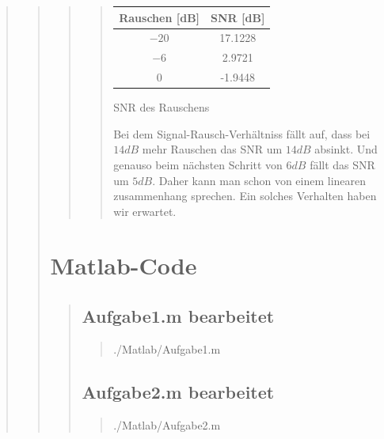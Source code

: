 \begin{quote}
\begin{quote}
\begin{quote}
\begin{quote}
            \begin{center}
                  \begin{tabular}{|c|c|}
                  \hline
                   Rauschen [dB] &  SNR [dB] \\ \hline 
                   $-20$ &  17.1228 \\ \hline
                   $-6$ &  2.9721 \\ \hline
                   $0$ &  -1.9448 \\ \hline           
                 \end{tabular}\vspace{1em}
                 
            \caption{SNR des Rauschens}            
            \end{center}
    
        Bei dem Signal-Rausch-Verhältniss fällt auf, dass bei $14dB$ mehr Rauschen das SNR um $14dB$ absinkt. Und
        genauso beim nächsten Schritt von $6dB$ fällt das SNR um $5dB$. Daher kann man schon von einem linearen
        zusammenhang sprechen. Ein solches Verhalten haben wir erwartet. 
    \end{quote}	
\end{quote}	




\section{Matlab-Code}
\begin{quote}
    \subsection{Aufgabe1.m bearbeitet}
    \begin{quote}
            
            {./Matlab/Aufgabe1.m}
    \end{quote}
    
    \subsection{Aufgabe2.m bearbeitet}
    \begin{quote}
            
            {./Matlab/Aufgabe2.m}
    \end{quote}
    

\end{quote}
\end{quote}
\end{quote}
